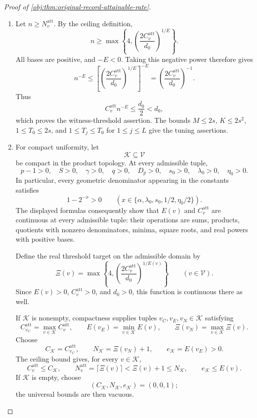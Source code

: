 \documentclass[11pt]{article}
\begin{document}
\begin{proof}[Proof of \cref{obj:thm:original-record-attainable-rate}]
\begin{enumerate}
\item Let \(n\ge N^{\mathrm{att}}_v\). By the ceiling definition,
\[
n\ge
\max\left\{4,
\left(\frac{2C^{\mathrm{att}}_v}{d_0}\right)^{1/E}\right\}.
\]
All bases are positive, and \(-E<0\). Taking this negative power therefore gives
\[
n^{-E}
\le
\left[
\left(\frac{2C^{\mathrm{att}}_v}{d_0}\right)^{1/E}
\right]^{-E}
=\left(\frac{2C^{\mathrm{att}}_v}{d_0}\right)^{-1}.
\]
Thus
\[
C^{\mathrm{att}}_v n^{-E}
\le\frac{d_0}{2}<d_0,
\]
which proves the witness-threshold assertion. The bounds \(M\le2s\), \(K\le2s^2\), \(1\le T_0\le2s\), and \(1\le T_j\le T_0\) for \(1\le j\le L\) give the tuning assertions.

\item For compact uniformity, let
\[
\mathcal K\subseteq\mathcal V
\]
be compact in the product topology. At every admissible tuple,
\[
p-1>0,\quad S>0,\quad\gamma>0,\quad q>0,\quad D_p>0,
\quad s_0>0,\quad\lambda_0>0,\quad\eta_0>0.
\]
In particular, every geometric denominator appearing in the constants satisfies
\[
1-2^{-x}>0
\qquad
\left(
x\in
\{\alpha,\lambda_0,s_0,1/2,\eta_0/2\}
\right).
\]
The displayed formulas consequently show that \(E(v)\) and
\(C^{\mathrm{att}}_v\) are continuous at every admissible tuple: their operations are sums, products, quotients with nonzero denominators, minima, square roots, and real powers with positive bases.

Define the real threshold target on the admissible domain by
\[
\Xi(v)
=\max\left\{4,
\left(\frac{2C^{\mathrm{att}}_v}{d_0}\right)^{1/E(v)}
\right\}
\qquad(v\in\mathcal V).
\]
Since \(E(v)>0\), \(C^{\mathrm{att}}_v>0\), and \(d_0>0\), this function is continuous there as well.

If \(\mathcal K\) is nonempty, compactness supplies tuples
\(v_C,v_E,v_N\in\mathcal K\) satisfying
\[
C^{\mathrm{att}}_{v_C}
=\max_{v\in\mathcal K}C^{\mathrm{att}}_v,
\qquad
E(v_E)=\min_{v\in\mathcal K}E(v),
\qquad
\Xi(v_N)=\max_{v\in\mathcal K}\Xi(v).
\]
Choose
\[
C_{\mathcal K}=C^{\mathrm{att}}_{v_C},
\qquad
N_{\mathcal K}=\Xi(v_N)+1,
\qquad
e_{\mathcal K}=E(v_E)>0.
\]
The ceiling bound gives, for every \(v\in\mathcal K\),
\[
C^{\mathrm{att}}_v\le C_{\mathcal K},
\qquad
N^{\mathrm{att}}_v=\lceil\Xi(v)\rceil
<\Xi(v)+1\le N_{\mathcal K},
\qquad
e_{\mathcal K}\le E(v).
\]
If \(\mathcal K\) is empty, choose
\[
(C_{\mathcal K},N_{\mathcal K},e_{\mathcal K})=(0,0,1);
\]
the universal bounds are then vacuous.


\end{enumerate}
\end{proof}
\end{document}
